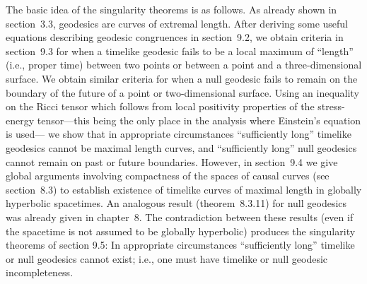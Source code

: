 The basic idea of the singularity theorems is as follows. As already shown in
section~3.3, geodesics are curves of extremal length. After deriving some useful
equations describing geodesic congruences in section~9.2, we obtain criteria in
section~9.3 for when a timelike geodesic fails to be a local maximum of ``length''
(i.e., proper time) between two points or between a point and a three-dimensional
surface. We obtain similar criteria for when a null geodesic fails to remain on the
boundary of the future of a point or two-dimensional surface. Using an inequality on
the Ricci tensor which follows from local positivity properties of the stress-energy
tensor---this being the only place in the analysis where Einstein's equation is used---
we show that in appropriate circumstances ``sufficiently long'' timelike geodesics
cannot be maximal length curves, and ``sufficiently long'' null geodesics cannot
remain on past or future boundaries. However, in section~9.4 we give global
arguments involving compactness of the spaces of causal curves (see section~8.3) to
establish existence of timelike curves of maximal length in globally hyperbolic
spacetimes. An analogous result (theorem~8.3.11) for null geodesics was already
given in chapter~8. The contradiction between these results (even if the spacetime is
not assumed to be globally hyperbolic) produces the singularity theorems of section
9.5: In appropriate circumstances ``sufficiently long'' timelike or null geodesics
cannot exist; i.e., one must have timelike or null geodesic incompleteness.
